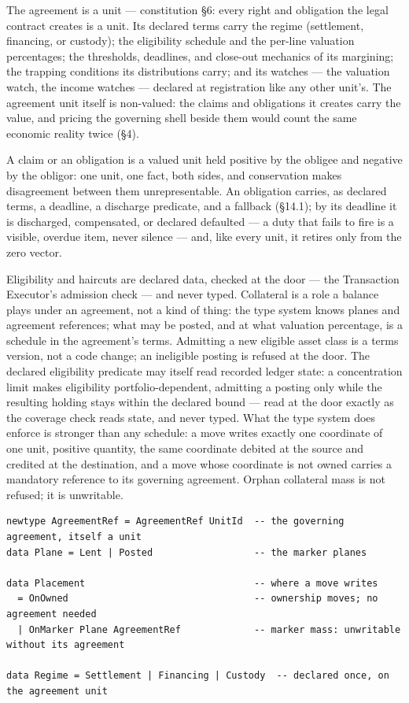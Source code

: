 \documentclass[11pt,a4paper]{article}
\begin{document}
The agreement is a unit --- constitution \S6: every right and obligation the
legal contract creates is a unit. Its declared terms carry the regime
(settlement, financing, or custody); the eligibility schedule and the per-line
valuation percentages; the thresholds, deadlines, and close-out mechanics of
its margining; the trapping conditions its distributions carry; and its
watches --- the valuation watch, the income watches --- declared at
registration like any other unit's. The agreement unit itself is non-valued:
the claims and obligations it creates carry the value, and pricing the
governing shell beside them would count the same economic reality twice
(\S4).

A claim or an obligation is a valued unit held positive by the obligee and
negative by the obligor: one unit, one fact, both sides, and conservation makes
disagreement between them unrepresentable. An obligation carries, as declared
terms, a deadline, a discharge predicate, and a fallback (\S14.1); by its
deadline it is discharged, compensated, or declared defaulted --- a duty that
fails to fire is a visible, overdue item, never silence --- and, like every
unit, it retires only from the zero vector.

Eligibility and haircuts are declared data, checked at the door --- the
Transaction Executor's admission check --- and never typed. Collateral is a
role a balance plays under an agreement, not a kind of thing: the type system
knows planes and agreement references; what may be posted, and at what
valuation percentage, is a schedule in the agreement's terms. Admitting a new
eligible asset class is a terms version, not a code change; an ineligible
posting is refused at the door. The declared eligibility predicate may itself read
recorded ledger state: a concentration limit makes eligibility portfolio-dependent,
admitting a posting only while the resulting holding stays within the declared bound
--- read at the door exactly as the coverage check reads state, and never typed. What
the type system does enforce is stronger
than any schedule: a move writes exactly one coordinate of one unit, positive
quantity, the same coordinate debited at the source and credited at the
destination, and a move whose coordinate is not owned carries a mandatory
reference to its governing agreement. Orphan collateral mass is not refused;
it is unwritable.

\begin{lstlisting}
newtype AgreementRef = AgreementRef UnitId  -- the governing agreement, itself a unit
data Plane = Lent | Posted                  -- the marker planes

data Placement                              -- where a move writes
  = OnOwned                                 -- ownership moves; no agreement needed
  | OnMarker Plane AgreementRef             -- marker mass: unwritable without its agreement

data Regime = Settlement | Financing | Custody  -- declared once, on the agreement unit
\end{lstlisting}
\end{document}
